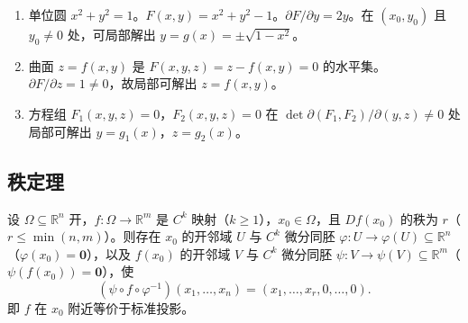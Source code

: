 \begin{example}[隐函数定理的应用]\label{ex:implicit_function_application}
\begin{enumerate}[label=(\roman*)]
    \item 单位圆 $x^2 + y^2 = 1$。$F(x, y) = x^2 + y^2 - 1$。$\partial F/\partial y = 2y$。在 $(x_0, y_0)$ 且 $y_0 \neq 0$ 处，可局部解出 $y = g(x) = \pm\sqrt{1 - x^2}$。
    \item 曲面 $z = f(x, y)$ 是 $F(x, y, z) = z - f(x, y) = 0$ 的水平集。$\partial F/\partial z = 1 \neq 0$，故局部可解出 $z = f(x, y)$。
    \item 方程组 $F_1(x, y, z) = 0$，$F_2(x, y, z) = 0$ 在 $\det \partial(F_1, F_2)/\partial(y, z) \neq 0$ 处局部可解出 $y = g_1(x)$，$z = g_2(x)$。
\end{enumerate}
\end{example}

\subsection{秩定理}

\begin{theorem}[秩定理]\label{thm:rank_theorem}
设 $\Omega \subseteq \mathbb{R}^n$ 开，$f: \Omega \to \mathbb{R}^m$ 是 $C^k$ 映射（$k \ge 1$），$x_0 \in \Omega$，且 $Df(x_0)$ 的秩为 $r$（$r \le \min(n, m)$）。则存在 $x_0$ 的开邻域 $U$ 与 $C^k$ 微分同胚 $\varphi: U \to \varphi(U) \subseteq \mathbb{R}^n$（$\varphi(x_0) = \mathbf{0}$），以及 $f(x_0)$ 的开邻域 $V$ 与 $C^k$ 微分同胚 $\psi: V \to \psi(V) \subseteq \mathbb{R}^m$（$\psi(f(x_0)) = \mathbf{0}$），使
\[
(\psi \circ f \circ \varphi^{-1})(x_1, \dots, x_n) = (x_1, \dots, x_r, 0, \dots, 0).
\]
即 $f$ 在 $x_0$ 附近等价于标准投影。
\end{theorem}

